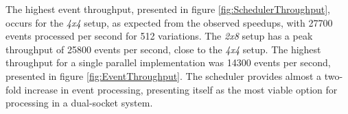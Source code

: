 The highest event throughput, presented in figure \ref{fig:SchedulerThroughput}, occurs for the \textit{4x4} setup, as expected from the observed speedups, with 27700 events processed per second for 512 variations. The \textit{2x8} setup has a peak throughput of 25800 events per second, close to the \textit{4x4} setup. The highest throughput for a single parallel implementation was 14300 events per second, presented in figure \ref{fig:EventThroughput}. The scheduler provides almost a two-fold increase in event processing, presenting itself as the most viable option for processing in a dual-socket system.
